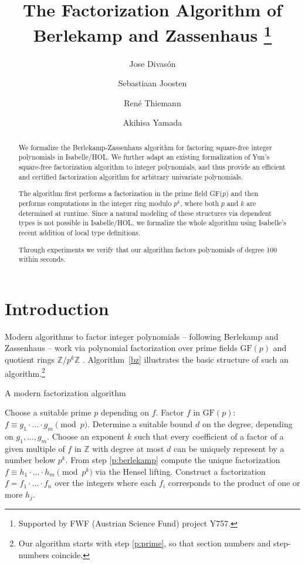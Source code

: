 \documentclass[11pt,a4paper]{article}
\newcommand\ints{\mathbb{Z}}
\newcommand\GFpp[1]{\ensuremath{\text{GF}(#1)}}
\newcommand\GFp{\GFpp{p}}
\newcommand\ring[1][p^k]{\ensuremath{\ints/{#1}\ints}\xspace}
\begin{document}
\title{The Factorization Algorithm of Berlekamp and Zassenhaus \footnote{Supported by FWF (Austrian Science Fund) project Y757.}}
\author{Jose Divas\'on \and
  Sebastiaan Joosten \and
  Ren\'e Thiemann \and
  Akihisa Yamada}
\maketitle

\begin{abstract}
We formalize the Berlekamp-Zassenhaus algorithm for factoring 
square-free integer polynomials in Isabelle/HOL.
We further adapt an existing formalization of
Yun's square-free factorization algorithm
to integer polynomials, and thus
provide an efficient and certified factorization
algorithm for arbitrary univariate polynomials.

The algorithm first performs a factorization in the prime field GF($p$)
and then performs computations in the integer ring modulo $p^k$,
where both $p$ and $k$ are determined at runtime.
Since a natural modeling of these structures via dependent types is
not possible in Isabelle/HOL,
we formalize the whole algorithm using Isabelle's recent 
addition of local type definitions. 

Through experiments we verify that
our algorithm factors polynomials of degree 100 within seconds.
\end{abstract}

\tableofcontents

\section{Introduction}

Modern algorithms to factor integer polynomials
-- following Berlekamp and Zassenhaus --
work via polynomial factorization over prime fields $\GFp$ and quotient rings \ring
\cite{Berlekamp,CZ81}.
Algorithm~\ref{bz} illustrates the basic structure of such an algorithm.\footnote{Our 
algorithm starts with step \ref{p:prime}, so that
section numbers and step-numbers coincide.}

\begin{algorithm}[h]
\caption{A modern factorization algorithm\label{bz}}
\setcounter{AlgoLine}{3} %
%
 Choose a suitable prime $p$ depending on $f$.\;
  Factor $f$ in \GFp: $f \equiv g_1 \cdot\ldots\cdot g_m \pmod p$.\;
 Determine a suitable bound $d$ on the degree, depending on $g_1,\ldots,g_m$.
  Choose an exponent $k$ such that every coefficient of a factor of a given multiple of $f$ in $\ints$ 
  with degree at most $d$ can be uniquely represent by a number below $p^k$. \;
 From step \ref{p:berlekamp} compute the
  unique factorization $f \equiv h_1 \cdot \ldots \cdot h_m \pmod {p^k}$ via the Hensel lifting.\;
 Construct a factorization $f = f_1 \cdot \ldots \cdot f_n$ 
  over the integers where each $f_i$ corresponds to the product of one or more $h_j$.
\end{algorithm}
\end{document}
